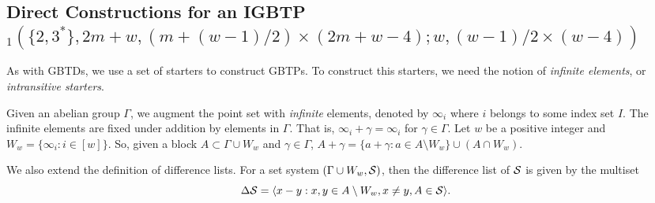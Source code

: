\documentclass[draft, 11pt]{article}
\begin{document}
\subsection{Direct Constructions for an IGBTP$_1(\{2,3^*\},2m+w,(m+(w-1)/{2})\times (2m+w-4);w,({w-1})/{2}\times (w-4))$}

As with GBTDs, we use a set of starters to construct GBTPs. 
To construct this starters, we need the notion of {\em infinite elements}, 
or {\em intransitive starters}.

Given an abelian group $\Gamma$, we augment the point set 
with {\em infinite} elements, denoted by $\infty_i$ where $i$ belongs to some index set $I$.
The infinite elements are fixed under addition by elements in $\Gamma$. 
That is, $\infty_i+\gamma=\infty_i$ for $\gamma\in \Gamma$. 
Let $w$ be a positive integer and $W_w=\{\infty_i: i\in [w]\}$.
So, given a block $A\subset\Gamma\cup W_w$ and $\gamma\in \Gamma$, 
$A+\gamma=\{a+\gamma: a\in A\setminus W_w\}\cup (A\cap W_w)$.

We also extend the definition of difference lists. For a set system $(\Gamma\cup W_w, \mathcal S)$, 
then the difference list of $\mathcal S$ is given by the multiset
\begin{equation*}
\Delta\mathcal S=\langle x-y: x,y\in A\setminus W_w, x\ne y, A\in \mathcal S \rangle.
\end{equation*}       
\end{document}
